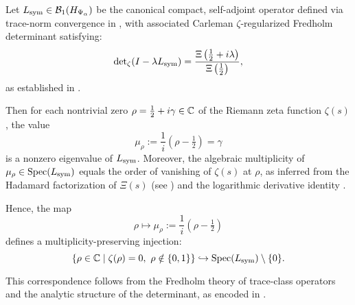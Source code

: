 \begin{lemma}
\label{lem:zero_to_eigenvalue_injection}
Let \( L_{\mathrm{sym}} \in \mathcal{B}_1(H_{\Psi_\alpha}) \) be the canonical compact, self-adjoint operator defined via trace-norm convergence in , with associated Carleman \(\zeta\)-regularized Fredholm determinant satisfying:
\[
\det\nolimits_{\zeta}(I - \lambda L_{\mathrm{sym}}) = \frac{\Xi\left(\tfrac{1}{2} + i\lambda\right)}{\Xi\left(\tfrac{1}{2}\right)},
\]
as established in .

Then for each nontrivial zero \( \rho = \tfrac{1}{2} + i\gamma \in \mathbb{C} \) of the Riemann zeta function \( \zeta(s) \), the value
\[
\mu_\rho := \frac{1}{i}(\rho - \tfrac{1}{2}) = \gamma
\]
is a nonzero eigenvalue of \( L_{\mathrm{sym}} \). Moreover, the algebraic multiplicity of \( \mu_\rho \in \operatorname{Spec}(L_{\mathrm{sym}}) \) equals the order of vanishing of \( \zeta(s) \) at \( \rho \), as inferred from the Hadamard factorization of \( \Xi(s) \) (see ) and the logarithmic derivative identity .

\medskip

\noindent
Hence, the map
\[
\rho \longmapsto \mu_\rho := \frac{1}{i}(\rho - \tfrac{1}{2})
\]
defines a multiplicity-preserving injection:
\[
\left\{ \rho \in \mathbb{C} \;\middle|\; \zeta(\rho) = 0,\ \rho \notin \{0,1\} \right\}
\hookrightarrow
\operatorname{Spec}(L_{\mathrm{sym}}) \setminus \{0\}.
\]

\noindent
This correspondence follows from the Fredholm theory of trace-class operators and the analytic structure of the determinant, as encoded in .
\end{lemma}
